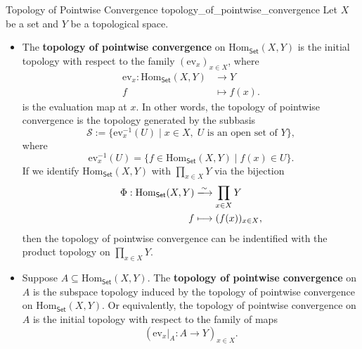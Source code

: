 \documentclass{report}
\begin{document}
\begin{definition}{Topology of Pointwise Convergence}
{topology_of_pointwise_convergence}
	Let $X$ be a set and $Y$ be a topological space. 
	\begin{itemize}
		\item The \textbf{topology of pointwise convergence} on $\mathrm{Hom}_{\mathsf{Set}}(X,Y)$ is the initial topology with respect to the family $\left( \mathrm{ev}_x \right)_{x\in X}$, where 
		\begin{align*}
			\mathrm{ev}_x:\mathrm{Hom}_{\mathsf{Set}}(X,Y)&\longrightarrow Y\\
			f&\longmapsto f(x).
		\end{align*}
		is the evaluation map at $x$. In other words, the topology of pointwise convergence is the topology generated by the subbasis
		\[
		\mathcal{S}:=\{\mathrm{ev}_x^{-1}(U)\mid x\in X, \;U\text{ is an open set of }Y\},
		\]
		where
		\[
			\mathrm{ev}_x^{-1}(U)=\{f\in \mathrm{Hom}_{\mathsf{Set}}(X,Y)\mid f(x)\in U\}.
		\]
		If we identify $\mathrm{Hom}_{\mathsf{Set}}(X,Y)$ with $\prod\limits_{x\in X}Y$ via the bijection 
		\begin{align*}
		\Phi:\mathrm{Hom}_{\mathsf{Set}}(X,Y)&\xlongrightarrow{\sim} \prod_{x\in X}Y\\	
		f&\longmapsto (f(x))_{x\in X}, 
		\end{align*}
		then the topology of pointwise convergence can be indentified with the product topology on $\prod\limits_{x\in X}Y$.
		\item Suppose $A\subseteq \mathrm{Hom}_{\mathsf{Set}}(X,Y)$. The \textbf{topology of pointwise convergence} on $A$ is the subspace topology induced by the topology of pointwise convergence on $\mathrm{Hom}_{\mathsf{Set}}(X,Y)$. Or equivalently, the topology of pointwise convergence on $A$ is the initial topology with respect to the family of maps
		\[
		\left( \mathrm{ev}_x|_{A}:A\longrightarrow Y \right)_{x\in X}.
		\]
	\end{itemize}
\end{definition}
\end{document}
